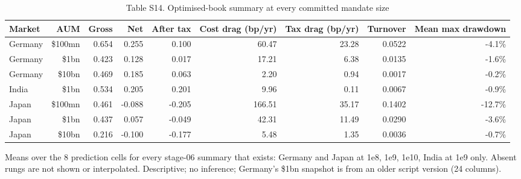 \begin{table}[t]
\centering
\small
\caption{Table S14. Optimised-book summary at every committed mandate size}
\label{tab:s14}
\begin{tabular}{lrrrrrrrr}
\toprule
Market & AUM & Gross & Net & After tax & Cost drag (bp/yr) & Tax drag (bp/yr) & Turnover & Mean max drawdown \\
\midrule
Germany & \$100mn & 0.654 & 0.255 & 0.100 & 60.47 & 23.28 & 0.0522 & -4.1\% \\
Germany & \$1bn & 0.423 & 0.128 & 0.017 & 17.21 & 6.38 & 0.0135 & -1.6\% \\
Germany & \$10bn & 0.469 & 0.185 & 0.063 & 2.20 & 0.94 & 0.0017 & -0.2\% \\
India & \$1bn & 0.534 & 0.205 & 0.201 & 9.96 & 0.11 & 0.0067 & -0.9\% \\
Japan & \$100mn & 0.461 & -0.088 & -0.205 & 166.51 & 35.17 & 0.1402 & -12.7\% \\
Japan & \$1bn & 0.437 & 0.057 & -0.049 & 42.31 & 11.49 & 0.0290 & -3.6\% \\
Japan & \$10bn & 0.216 & -0.100 & -0.177 & 5.48 & 1.35 & 0.0036 & -0.7\% \\
\bottomrule
\end{tabular}
\par\vspace{2pt}
\parbox{\textwidth}{\footnotesize Means over the 8 prediction cells for every stage-06 summary that exists: Germany and Japan at 1e8, 1e9, 1e10, India at 1e9 only. Absent rungs are not shown or interpolated. Descriptive; no inference; Germany's \$1bn snapshot is from an older script version (24 columns).}
\end{table}
